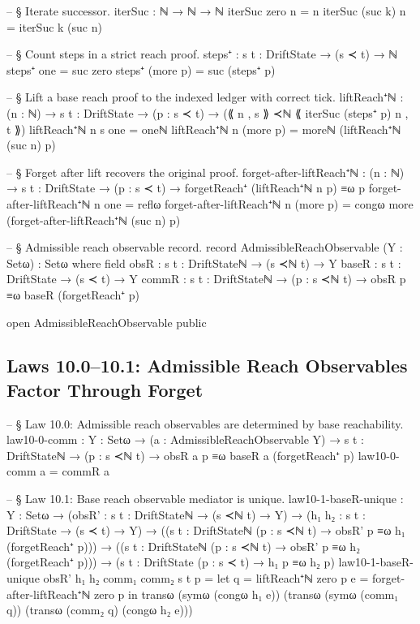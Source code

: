 \documentclass[11pt,a4paper]{book}
\begin{document}
\begin{code}
-- § Iterate successor.
iterSuc : ℕ → ℕ → ℕ
iterSuc zero    n = n
iterSuc (suc k) n = iterSuc k (suc n)

-- § Count steps in a strict reach proof.
steps⁺ : {s t : DriftState} → (s ≺ t) → ℕ
steps⁺ one      = suc zero
steps⁺ (more p) = suc (steps⁺ p)

-- § Lift a base reach proof to the indexed ledger with correct tick.
liftReach⁺ℕ :
  (n : ℕ) → {s t : DriftState} →
  (p : s ≺ t) →
  (⟪ n , s ⟫ ≺ℕ ⟪ iterSuc (steps⁺ p) n , t ⟫)
liftReach⁺ℕ n {s} one = oneℕ
liftReach⁺ℕ n (more p) = moreℕ (liftReach⁺ℕ (suc n) p)

-- § Forget after lift recovers the original proof.
forget-after-liftReach⁺ℕ :
  (n : ℕ) → {s t : DriftState} →
  (p : s ≺ t) →
  forgetReach⁺ (liftReach⁺ℕ n p) ≡ω p
forget-after-liftReach⁺ℕ n one = reflω
forget-after-liftReach⁺ℕ n (more p) = congω more (forget-after-liftReach⁺ℕ (suc n) p)

-- § Admissible reach observable record.
record AdmissibleReachObservable (Y : Setω) : Setω where
  field
    obsR  : {s t : DriftStateℕ} → (s ≺ℕ t) → Y
    baseR : {s t : DriftState} → (s ≺ t) → Y
    commR : {s t : DriftStateℕ} → (p : s ≺ℕ t) → obsR p ≡ω baseR (forgetReach⁺ p)

open AdmissibleReachObservable public
\end{code}

\subsection{Laws 10.0--10.1: Admissible Reach Observables Factor Through Forget}

\begin{code}
-- § Law 10.0: Admissible reach observables are determined by base reachability.
law10-0-comm : {Y : Setω} → (a : AdmissibleReachObservable Y) → {s t : DriftStateℕ} → (p : s ≺ℕ t) → obsR a p ≡ω baseR a (forgetReach⁺ p)
law10-0-comm a = commR a

-- § Law 10.1: Base reach observable mediator is unique.
law10-1-baseR-unique :
  {Y : Setω} →
  (obsR' : {s t : DriftStateℕ} → (s ≺ℕ t) → Y) →
  (h₁ h₂ : {s t : DriftState} → (s ≺ t) → Y) →
  (({s t : DriftStateℕ} (p : s ≺ℕ t) → obsR' p ≡ω h₁ (forgetReach⁺ p))) →
  (({s t : DriftStateℕ} (p : s ≺ℕ t) → obsR' p ≡ω h₂ (forgetReach⁺ p))) →
  ({s t : DriftState} (p : s ≺ t) → h₁ p ≡ω h₂ p)
law10-1-baseR-unique obsR' h₁ h₂ comm₁ comm₂ {s} {t} p =
  let
    q = liftReach⁺ℕ zero p
    e = forget-after-liftReach⁺ℕ zero p
  in
  transω
    (symω (congω h₁ e))
    (transω
      (symω (comm₁ q))
      (transω (comm₂ q) (congω h₂ e)))
\end{code}
\end{document}
